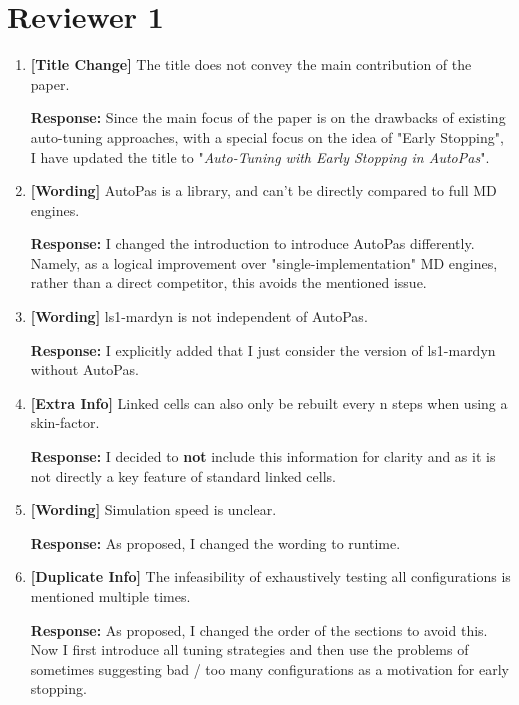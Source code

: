 \documentclass[12pt,a4paper]{article}
\begin{document}
\section*{Reviewer 1}
\begin{enumerate}[label=\textbf{Comment \arabic*:}, itemsep=0.8em]
      \item \textbf{[Title Change]} The title does not convey the main contribution of the paper.

            \textbf{Response:}
            Since the main focus of the paper is on the drawbacks of existing auto-tuning approaches, with a special focus on the idea of "Early Stopping", I have updated the title to "\textit{Auto-Tuning with Early Stopping in AutoPas}".

      \item \textbf{[Wording]} AutoPas is a library, and can't be directly compared to full MD engines.

            \textbf{Response:} I changed the introduction to introduce AutoPas differently. Namely, as a logical improvement over "single-implementation" MD engines, rather than a direct competitor, this avoids the mentioned issue.

      \item \textbf{[Wording]} ls1-mardyn is not independent of AutoPas.

            \textbf{Response:} I explicitly added that I just consider the version of ls1-mardyn without AutoPas.

      \item \textbf{[Extra Info]} Linked cells can also only be rebuilt every n steps when using a skin-factor.

            \textbf{Response:} I decided to \textbf{not} include this information for clarity and as it is not directly a key feature of standard linked cells.

      \item \textbf{[Wording]} Simulation speed is unclear.

            \textbf{Response:} As proposed, I changed the wording to runtime.

      \item \textbf{[Duplicate Info]} The infeasibility of exhaustively testing all configurations is mentioned multiple times.

            \textbf{Response:} As proposed, I changed the order of the sections to avoid this. Now I first introduce all tuning strategies and then use the problems of sometimes suggesting bad / too many configurations as a motivation for early stopping.


\end{enumerate}
\end{document}
